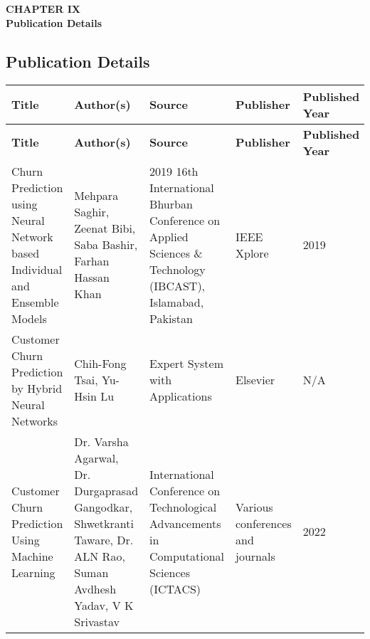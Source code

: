 \section*{}
\begin{center}
    {\fontsize{14}{1.5}\selectfont \textbf{CHAPTER IX}}\\
    \vspace{12pt}
    {\fontsize{16}{1.5}\selectfont \textbf{Publication Details
}}\\
    \vspace{12pt}
    \vspace{12pt}
\end{center}
\setcounter{section}{9}
\setcounter{subsection}{0}
\renewcommand{\theequation}{\thesection.\arabic{equation}}
\renewcommand{\thetable}{\thesection.\arabic{table}}
\renewcommand{\thefigure}{\thesection.\arabic{figure}}
\setcounter{table}{0}
\setcounter{figure}{0}
\setcounter{equation}{0}


\subsection*{Publication Details}

\begin{longtable}{|p{4cm}|p{4cm}|p{3cm}|p{2cm}|p{2cm}|}
\hline
\textbf{Title} & \textbf{Author(s)} & \textbf{Source} & \textbf{Publisher} & \textbf{Published Year} \\
\hline
\endfirsthead
\hline
\textbf{Title} & \textbf{Author(s)} & \textbf{Source} & \textbf{Publisher} & \textbf{Published Year} \\
\hline
\endhead
Churn Prediction using Neural Network based Individual and Ensemble Models & Mehpara Saghir, Zeenat Bibi, Saba Bashir, Farhan Hassan Khan
 & 2019 16th International Bhurban Conference on Applied Sciences \& Technology (IBCAST), Islamabad, Pakistan & IEEE Xplore & 2019 \\
\hline
Customer Churn Prediction by Hybrid Neural Networks & Chih-Fong Tsai, Yu-Hsin Lu 
 & Expert System with Applications & Elsevier & N/A \\
\hline
Customer Churn Prediction Using Machine Learning & Dr. Varsha Agarwal, Dr. Durgaprasad Gangodkar,  Shwetkranti Taware, Dr. ALN Rao, Suman Avdhesh Yadav, V K Srivastav 
 & International Conference on Technological Advancements in Computational Sciences (ICTACS) & Various conferences and journals & 2022 \\
\hline
\end{longtable}

